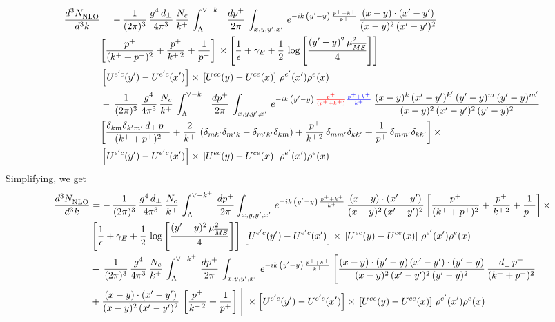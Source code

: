 \documentclass[9pt]{article}
\numberwithin{equation}{section}
\begin{document}
\begin{align}
     \frac{d^{3}N_{\rm NLO}^{\rm}}{d^{3}k}  & = -\,\frac{1}{(2\pi)^{3}}\,\frac{g^{4}\,d_{\perp}}{4\pi^{3}}\,\frac{N_{c}}{k^{+}}\,\int_{\Lambda}^{\vee-k^{+}}\, \frac{dp^{+}}{2\pi}\,\int_{x,y,y^{\prime},x'}\,e^{-ik\,\left(y'-y\right)\,\frac{p^{+}+k^{+}}{k^{+}}}\,\frac{(x-y)\cdot (x'-y')}{(x-y)^{2}\,(x'-y')^{2}}\notag \\ &  \bigg[\frac{p^{+}}{(k^{+}+p^{+})^{2}} + \frac{p^{+}}{k^{+\,2}}+\frac{1}{p^{+}}\bigg]\,\times\left[\frac{1}{\epsilon} +\gamma_{E} +\frac{1}{2}\,\log{\left[\frac{(y'-y)^{2}\,\mu^{2}_{\overline{MS}}}{4}\right]}\right]\notag \\ &  \left[U^{e'c}(y') - U^{e'c}(x')\right] \times\, \left[U^{ec}(y) - U^{ce}(x)\right]\, \rho^{e'}(x') \rho^{e}(x)\notag \\ & -\,\frac{1}{(2\pi)^{3}}\,\frac{g^{4}}{4\pi^{3}}\,\frac{N_{c}}{k^{+}}\,\int_{\Lambda}^{\vee-k^{+}}\, \frac{dp^{+}}{2\pi}\,\int_{x,y,y^{\prime},x'}\,e^{-ik\,\left(y'-y\right)\,{\color{red}\frac{p^{+}}{(p^{+}+k^{+})}}{\color{blue}\frac{p^{+}+k^{+}}{k^{+}}}}\,\frac{(x-y)^{k}\,(x'-y')^{k'}\,(y'-y)^{m}\,(y'-y)^{m'}}{(x-y)^{2}\,(x'-y')^{2}\,(y'-y)^{2}}\notag \\ &  \bigg[\frac{\delta_{km}\delta_{k'm'}\,d_{\perp}\,p^{+}}{(k^{+}+p^{+})^{2}}+\frac{2}{k^{+}}\,\left(\delta_{mk'}\delta_{m'k}-\delta_{m'k'}\delta_{km}\right) + \frac{p^{+}}{k^{+\,2}}\,\delta_{mm'}\delta_{kk'}+\frac{1}{p^{+}}\,\delta_{mm'}\delta_{kk'}\bigg]\,\times\notag \\ &  \left[U^{e'c}(y') - U^{e'c}(x')\right] \times\, \left[U^{ec}(y) - U^{ce}(x)\right]\, \rho^{e'}(x') \rho^{e}(x)
\end{align}
Simplifying, we get
\begin{align}
     \frac{d^{3}N_{\rm NLO}^{\rm}}{d^{3}k}  & = -\,\frac{1}{(2\pi)^{3}}\,\frac{g^{4}\,d_{\perp}}{4\pi^{3}}\,\frac{N_{c}}{k^{+}}\,\int_{\Lambda}^{\vee-k^{+}}\, \frac{dp^{+}}{2\pi}\int_{x,y,y^{\prime},x'}\,e^{-ik\,\left(y'-y\right)\,\frac{p^{+}+k^{+}}{k^{+}}}\,\frac{(x-y)\cdot (x'-y')}{(x-y)^{2}\,(x'-y')^{2}}\,\bigg[\frac{p^{+}}{(k^{+}+p^{+})^{2}} + \frac{p^{+}}{k^{+\,2}}+\frac{1}{p^{+}}\bigg]\,\times\notag \\ & \left[\frac{1}{\epsilon} +\gamma_{E} +\frac{1}{2}\,\log{\left[\frac{(y'-y)^{2}\,\mu^{2}_{\overline{MS}}}{4}\right]}\right]\,\left[U^{e'c}(y') - U^{e'c}(x')\right] \times\, \left[U^{ec}(y) - U^{ce}(x)\right]\, \rho^{e'}(x') \rho^{e}(x)\notag \\ & -\,\frac{1}{(2\pi)^{3}}\,\frac{g^{4}}{4\pi^{3}}\,\frac{N_{c}}{k^{+}}\,\int_{\Lambda}^{\vee-k^{+}}\, \frac{dp^{+}}{2\pi}\,\int_{x,y,y^{\prime},x'}\,e^{-ik\,\left(y'-y\right)\,\frac{p^{+}+k^{+}}{k^{+}}}\,\Bigg[\frac{(x-y)\cdot (y'-y)\, (x'-y')\cdot (y'-y)}{(x-y)^{2}\,(x'-y')^{2}\,(y'-y)^{2}}\,\frac{d_{\perp}\,p^{+}}{(k^{+}+p^{+})^{2}}\notag \\ & + \frac{(x-y)\cdot (x'-y')}{(x-y)^{2}\,(x'-y')^{2}}\,\left[\frac{p^{+}}{k^{+\,2}} + \frac{1}{p^{+}}\right]\Bigg]\,\times \left[U^{e'c}(y') - U^{e'c}(x')\right] \times\, \left[U^{ec}(y) - U^{ce}(x)\right]\, \rho^{e'}(x') \rho^{e}(x)
\end{align}
\end{document}
